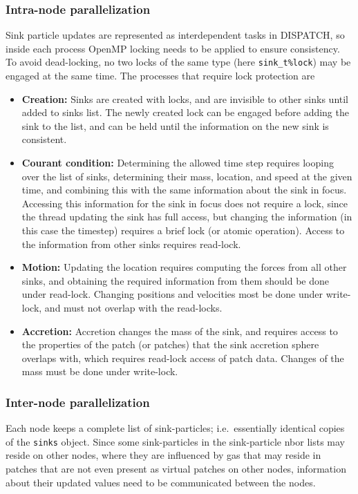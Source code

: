 \documentclass[paper=a4,fontsize=11pt]{scrartcl}
\numberwithin{equation}{section}		%
\numberwithin{figure}{section}			%
\numberwithin{table}{section}				%
\newcommand{\codecolor}{\color{Blue}}
\newcommand{\Code}[1]{{\codecolor\texttt{#1}}}
\begin{document}
\subsubsection{Intra-node parallelization}
Sink particle updates are represented as interdependent tasks in DISPATCH, so inside each process OpenMP locking needs to be applied to ensure consistency.  To avoid dead-locking, no two locks of the same type (here  \Code{sink\_t\%lock}) may be engaged at the same time.  The processes that require lock protection are
\begin{itemize}
    \item \textbf{Creation:} Sinks are created with locks, and are invisible to other sinks until added to sinks list.  The newly created lock can be engaged before adding the sink to the list, and can be held until the information on the new sink is consistent.
    \item \textbf{Courant condition:} Determining the allowed time step requires looping over the list of sinks, determining their mass, location, and speed at the given time, and combining this with the same information about the sink in focus.  Accessing this information for the sink in focus does not require a lock, since the thread updating the sink has full access, but changing the information (in this case the timestep) requires a brief lock (or atomic operation).   Access to the information from other sinks requires read-lock.
    \item \textbf{Motion:} Updating the location requires computing the forces from all other sinks, and obtaining the required information from them should be done under read-lock.  Changing positions and velocities most be done under write-lock, and must not overlap with the read-locks.
    \item \textbf{Accretion:} Accretion changes the mass of the sink, and requires access to the properties of the patch (or patches) that the sink accretion sphere overlaps with, which requires read-lock access of patch data.  Changes of the mass must be done under write-lock.
\end{itemize}

\subsubsection{Inter-node parallelization}

Each node keeps a complete list of sink-particles; i.e.\ essentially identical copies of the \Code{sinks} object.  Since some sink-particles in the sink-particle nbor lists may reside on other nodes, where they are influenced by gas that may reside in patches that are not even present as virtual patches on other nodes, information about their updated values need to be communicated between the nodes.
\end{document}
